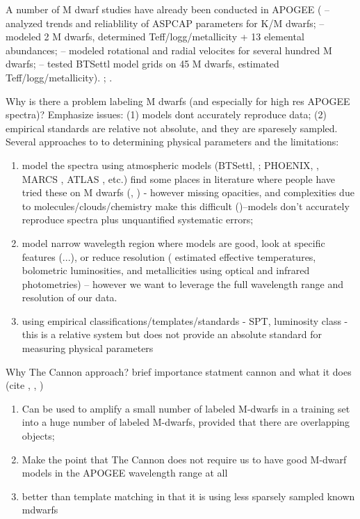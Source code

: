 \documentclass[preprint]{aastex62}
\begin{document}
A number of M dwarf studies have already been conducted in APOGEE (\citealt{Schmidt:2016} -- analyzed trends and reliablility of ASPCAP parameters for K/M dwarfs; \citealt{Souto:2017} -- modeled 2 M dwarfs, determined Teff/logg/metallicity + 13 elemental abundances; \citealt{Desphande:2013} -- modeled rotational and radial velocites for several hundred M dwarfs; \citealt{Rajpurohit:2018} -- tested BTSettl model grids on 45 M dwarfs, estimated Teff/logg/metallicity). \citealt{Gilhool:2018}; \citealt{Skinner:2018}.

Why is there a problem labeling M dwarfs (and especially for high res APOGEE spectra)? Emphasize issues: (1) models dont accurately reproduce data; (2) empirical standards are relative not absolute, and they are sparesely sampled. Several approaches to to determining physical parameters and the limitations:

\begin{enumerate}
\item model the spectra using atmospheric models (BTSettl, \citealt{Allard:2011}; PHOENIX, \citealt{Husser:2013}, MARCS \citealt{Gustafsson:2008}, ATLAS \citealt{Castelli:2004}, etc.) find some places in literature where people have tried these on M dwarfs (\citealt{Rajpurohit:2014}, \citealt{Rajpurohit:2018}) - however missing opacities, and complexities due to molecules/clouds/chemistry make this difficult (\citealt{Allard:2013})--models don't accurately reproduce spectra plus unquantified systematic errors; 

\item model narrow wavelegth region where models are good, look at specific features (\citealt{Rojas-Ayala:2012}...), or reduce resolution (\citealt{Casagrande:2008} estimated effective temperatures, bolometric luminosities, and metallicities using optical and infrared photometries) -- however we want to leverage the full wavelength range and resolution of our data.

\item using empirical classifications/templates/standards - SPT, luminosity class - this is a relative system but does not provide an absolute standard for measuring physical parameters
\end{enumerate}

Why The Cannon approach? brief importance statment cannon and what it does (cite \citealt{Ness:2015}, \citealt{Ho:2017a}, \citealt{Casey:2016}) \color{gcolor}{For Hogg to articulate...}\color{black}

\begin{enumerate}
\item Can be used to amplify a small number of labeled M-dwarfs in a training set into a huge number of labeled M-dwarfs, provided that there are overlapping objects; 

\item Make the point that The Cannon does not require us to have good M-dwarf models in the APOGEE wavelength range at all 

\item better than template matching in that it is using less sparsely sampled known mdwarfs
\end{enumerate}
\end{document}
